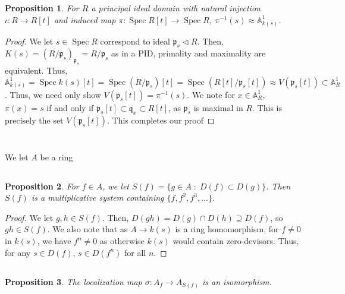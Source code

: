 \documentclass[english]{article}
\DeclareMathOperator{\spec}{Spec}
\newcommand{\Aa}{\mathbb{A}}
\newcommand{\pfr}{\mathfrak{p}}
\newcommand{\qfr}{\mathfrak{q}}
\newcommand{\prob}[1]{\setcounter{section}{#1-1}\section{}}
\newcommand{\prt}[1]{\setcounter{subsection}{#1-1}\subsection{}}
\newtheorem*{proposition*}{Proposition}
\theoremstyle{remark}
\theoremstyle{definition}
\begin{document}
\prob{3}
\begin{proposition*}
	For $R$ a principal ideal domain with natural injection $\iota:R\to R[t]$ and induced map $\pi:\spec R[t]\to \spec R$, $\pi^{-1}(s)\approx \mathbb{A}_{k(s)}^1$.
\end{proposition*}
\begin{proof}
	We let $s\in \spec{R}$ correspond to ideal $\pfr_s\triangleleft R$. Then, $K(s)=\left(R/\pfr_s\right)_{\pfr_s}=R/\pfr_s$ as in a PID, primality and maximality are equivalent. Thus, $\Aa_{k(s)}^1=\spec{k(s)[t]}=\spec{(R/\pfr_s)[t]}=\spec{(R[t]/\pfr_s[t])}\approx V(\pfr_s[t])\subset \Aa_{R}^1$. Thus, we need only show $V(\pfr_s[t])=\pi^{-1}(s)$. We note for $x\in \Aa_{R}^1$, $\pi(x)=s$ if and only if $\pfr_s[t]\subset \qfr_x\subset R[t]$, as $\pfr_s$ is maximal in $R$. This is precisely the set $V(\pfr_s[t])$. This completes our proof 
\end{proof}
\prob{4}
We let $A$ be a ring
\prt{1}
\begin{proposition*}
	For $f\in A$, we let $S(f)=\{g\in A\;:\;D(f)\subset D(g)\}$. Then $S(f)$ is a multiplicative system containing $\{f,f^2,f^3,\hdots\}$.
\end{proposition*}
\begin{proof}
	We let $g,h\in S(f)$. Then, $D(gh)=D(g)\cap D(h)\supseteq D(f)$, so $gh\in S(f)$. We also note that as $A\to k(s)$ is a ring homomorphism, for $f\neq 0$ in $k(s)$, we have $f^n\neq 0$ as otherwise $k(s)$ would contain zero-devisors. Thus, for any $s\in D(f)$, $s\in D(f^n)$ for all $n$. 
\end{proof}
\prt{2}
\begin{proposition*}
The localization map $\sigma: A_f\to A_{S(f)}$ is an isomorphism.
\end{proposition*}
\end{document}
